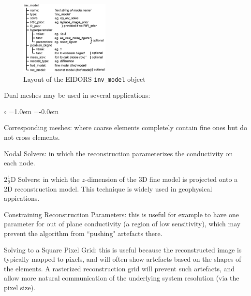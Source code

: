 \documentclass[12pt,draft]{iopart}
\begin{document}
\begin{figure}[tbh]
\begin{center}
 \includegraphics[width= 0.40\textwidth,bb=0 0 788 655]{../paper-EIT2008/figs/inv_model.png}
\caption{ \label{fig:invmdl}
\small
Layout of the EIDORS {\tt inv\_model} object
}
\end{center}
\vspace{-0.5cm}
\end{figure}

Dual meshes may be used in several applications:
\begin{list}{$\circ$} %
  {\leftmargin=1.0em \itemindent=-0.0em
    \baselineskip
    \baselineskip}
\item
   Corresponding meshes: where 
   coarse elements completely contain fine ones but do not
   cross elements.
\item
   Nodal Solvers: in which the reconstruction parameterizes
   the conductivity on each node\cite{graham2006}.
\item
   $2\frac{1}{2}$D Solvers: in which the $z$-dimension of the
     3D fine model is projected onto a 2D reconstruction model.
     This technique is widely used in geophysical appications.
\item
   Constraining Reconstruction Parameters:
      this is useful for example to have one parameter
      for out of plane conductivity (a region of low sensitivity),
      which may prevent the algorithm from ``pushing" artefacts there.
\item
   Solving to a Square Pixel Grid: this is useful because the
       reconstructed image is typically mapped to pixels, and
       will often show artefacts based on the shapes of the elements.
       A rasterized reconstruction grid will prevent such
       artefacts, and allow more natural communication of the
       underlying system resolution (via the pixel size).
\end{list}


%
\end{document}
